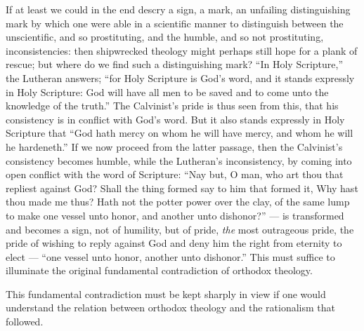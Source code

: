 \documentclass[12pt]{book}
\newcommand{\opage}[1]{\marginnote{\footnotesize\textit{[#1]}}}
\begin{document}
If at least we could in the end descry a sign, a mark, an unfailing
distinguishing mark by which one were able in a scientific manner to
distinguish between the unscientific, and so prostituting, and the humble,
and so not prostituting, inconsistencies: then shipwrecked theology might
perhaps still hope for a plank of rescue; but where do we find such a
distinguishing mark? ``In Holy Scripture,'' the Lutheran answers; ``for Holy
Scripture is God's word, and it stands expressly in Holy Scripture: God will
have all men to be saved and to come unto the knowledge of the truth.'' The
Calvinist's pride is thus seen from this, that his consistency is in conflict
with God's word. But it also stands expressly in Holy Scripture that ``God
hath mercy on whom he will have mercy, and whom he will he hardeneth.'' If we
now proceed from the latter passage, then the Calvinist's consistency becomes
humble, while the Lutheran's inconsistency,
\opage{250}\setcounter{footnote}{0}%
by coming into open conflict with the word of Scripture: ``Nay but, O man, who
art thou that repliest against God? Shall the thing formed say to him that
formed it, Why hast thou made me thus? Hath not the potter power over the
clay, of the same lump to make one vessel unto honor, and another unto
dishonor?'' --- is transformed and becomes a sign, not of humility, but of
pride, \emph{the} most outrageous pride, the pride of wishing to reply against
God and deny him the right from eternity to elect --- ``one vessel unto honor,
another unto dishonor.'' This must suffice to illuminate the original
fundamental contradiction of orthodox theology.

This fundamental contradiction must be kept sharply in view if one would
understand the relation between orthodox theology and the rationalism that
followed.
\end{document}
